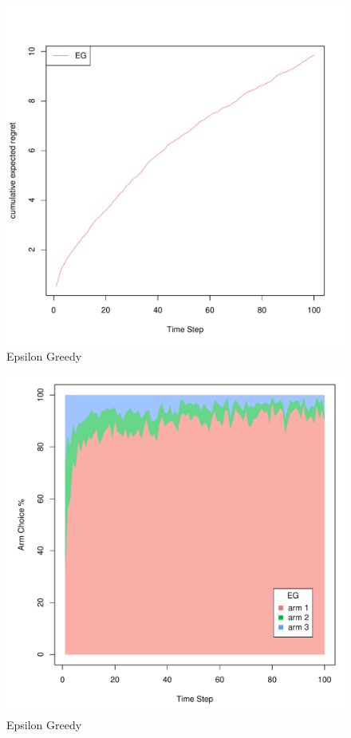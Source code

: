 \documentclass[nojss]{jss}\usepackage[]{graphicx}\usepackage[]{color}
\makeatletter
\def\maxwidth{ %
  \ifdim\Gin@nat@width>\linewidth
    \linewidth
  \else
    \Gin@nat@width
  \fi
}
\newenvironment{knitrout}{}{} %
\makeatother
\begin{document}
\begin{center}
\begin{knitrout}
\color{fgcolor}\begin{figure}
\includegraphics[width=\maxwidth]{fig/fig1-1} \caption[Epsilon Greedy]{Epsilon Greedy}\label{fig:fig11}
\end{figure}

\begin{figure}
\includegraphics[width=\maxwidth]{fig/fig1-2} \caption[Epsilon Greedy]{Epsilon Greedy}\label{fig:fig12}
\end{figure}


\end{knitrout}
\end{center}
\end{document}
